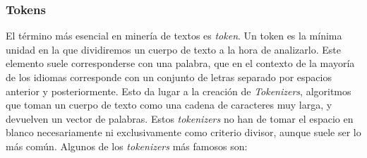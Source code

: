 \subsubsection{Tokens}
El término más esencial en minería de textos es \textit{token}. Un token es la mínima unidad en la que dividiremos un cuerpo de texto a la hora de analizarlo. Este elemento suele corresponderse con una palabra, que en el contexto de la mayoría de los idiomas corresponde con un conjunto de letras separado por espacios anterior y posteriormente. Esto da lugar a la creación de \textit{Tokenizers}, algoritmos que toman un cuerpo de texto como una cadena de caracteres muy larga, y devuelven un vector de palabras. Estos \textit{tokenizers } no han de tomar el espacio en blanco necesariamente ni exclusivamente como criterio divisor, aunque suele ser lo más común. Algunos de los \textit{tokenizers} más famosos son:

